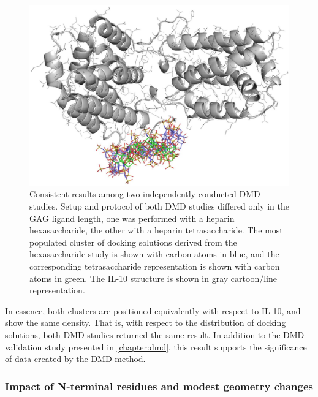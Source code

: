 \begin{figure}
\centering
\includegraphics[width=1.0\textwidth]{gfx/dmdil10/hp_hexa_vs_tetra_clusters_position_match_cropped.jpg}
\caption[]{Consistent results among two independently conducted DMD studies.
Setup and protocol of both DMD studies differed only in the GAG ligand length,
one was performed with a heparin hexasaccharide, the other with a heparin
tetrasaccharide. The most populated cluster of docking solutions derived from
the hexasaccharide study is shown with carbon atoms in blue, and the
corresponding tetrasaccharide representation is shown with carbon atoms in
green. The IL-10 structure is shown in gray cartoon/line representation. }
\label{fig:dmdil10:hp_hexa_vs_tetra_clusters_position_match}
\end{figure}

In essence, both clusters are positioned equivalently with respect to IL-10, and
show the same density. That is, with respect to the distribution of docking
solutions, both DMD studies returned the same result. In addition to the DMD
validation study presented in \cref{chapter:dmd}, this result supports the
significance of data created by the DMD method.


\subsubsection{Impact of N-terminal residues and modest geometry changes}

